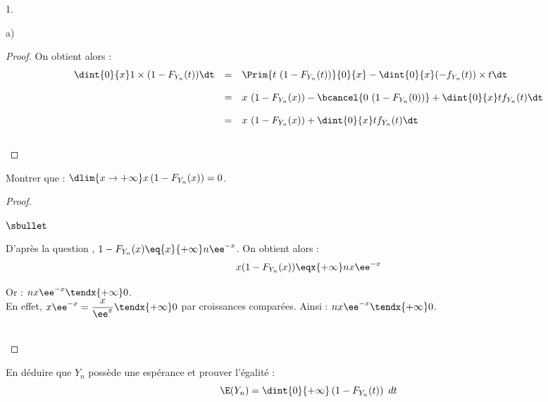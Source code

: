\documentclass[11pt]{article}%
\begin{document}
\begin{noliste}{1.}
\begin{noliste}{a)}
\begin{proof}

      
      \noindent
      On obtient alors :
      \[
       \begin{array}{rcl}
        \dint{0}{x} 1 \times (1-F_{Y_n}(t))\dt & = & \Prim{ 
	t \ (1-F_{Y_n}(t))}{0}{x} - \dint{0}{x} (-f_{Y_n}(t)) \times 
	t\dt
        \\[.4cm]
        & = & x \ (1-F_{Y_n}(x)) - \bcancel{0 \ (1-F_{Y_n}(0))}
         + \dint{0}{x} tf_{Y_n}(t) \dt
        \\[.4cm]
        & = & x \ (1-F_{Y_n}(x)) + \dint{0}{x} tf_{Y_n}(t) \dt
       \end{array}
      \]
      ~\\[-1cm]
    \end{proof}
    
  \item Montrer que : $\dlim{ x \to + \infty} x\left(1-F_{Y_{n}}(x)
    \right) = 0$.
    
    \begin{proof}~%
      \begin{noliste}{$\sbullet$}
      \item D'après la question , $1-F_{Y_n}(x)
        \eq{x}{+\infty} n\ee^{-x}$. On obtient alors :
        \[
        x(1-F_{Y_n}(x)) \eqx{+\infty} nx\ee^{-x}
        \]

      \item Or : $nx\ee^{-x} \tendx{+\infty} 0$.\\
        En effet, $x\ee^{-x} = \dfrac{x}{\ee^x} \tendx{+\infty} 0$ par
        croissances comparées. Ainsi : $nx\ee^{-x} \tendx{+\infty} 0$.
      \end{noliste}
      ~\\[-1.2cm]
    \end{proof}
    
  \item En déduire que $Y_{n}$ possède une espérance et prouver
    l'égalité :
    \[
    \E(Y_{n}) = \dint{0}{+ \infty} \left(1-F_{Y_{n}}(t)\right) \ dt
    \]~\\[-1.2cm]
    

\end{noliste}
\end{noliste}
\end{document}
